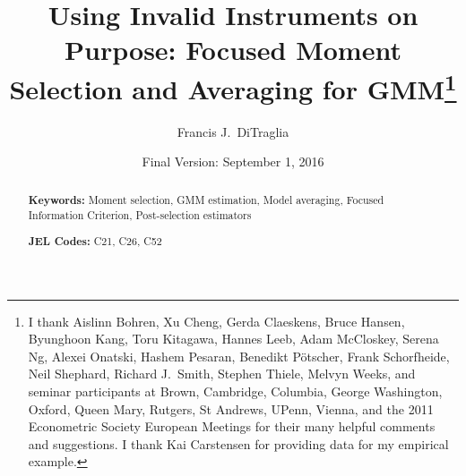 \documentclass[12pt]{article}
\begin{document}
\title{Using Invalid Instruments on Purpose: Focused Moment Selection and Averaging for GMM\footnote{I thank Aislinn Bohren, Xu Cheng, Gerda Claeskens, Bruce Hansen, Byunghoon Kang, Toru Kitagawa, Hannes Leeb, Adam McCloskey, Serena Ng, Alexei Onatski, Hashem Pesaran, Benedikt P\"{o}tscher, Frank Schorfheide, Neil Shephard, Richard J.\ Smith, Stephen Thiele, Melvyn Weeks, and seminar participants at 
Brown, Cambridge, Columbia, George Washington, Oxford, Queen Mary, Rutgers, St Andrews, UPenn, Vienna, and the 2011 Econometric Society European Meetings for their many helpful comments and suggestions. I thank Kai Carstensen for providing data for my empirical example.}}

\author{Francis J.\ DiTraglia}%

 \date{\footnotesize Final Version: September 1, 2016} 

\maketitle 
\begin{abstract}
	

	\bigskip
	\noindent\textbf{Keywords:} Moment selection, GMM estimation, Model averaging, Focused Information Criterion, Post-selection estimators

	\medskip
	\noindent\textbf{JEL Codes:} C21, C26, C52 
\end{abstract}
















\newpage



\small

\end{document}
